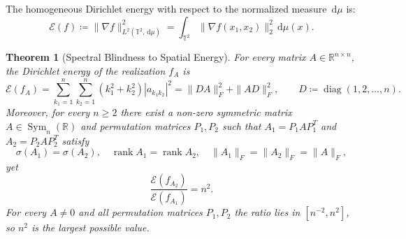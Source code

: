 \documentclass[11pt,a4paper,reqno]{amsart}
\newtheorem{theorem}{Theorem}[section]
\theoremstyle{definition}
\numberwithin{equation}{section}
\newcommand{\R}{\mathbb{R}}
\newcommand{\Tor}{\mathbb{T}}
\newcommand{\rank}{\operatorname{rank}}
\newcommand{\dif}{\,\mathrm{d}}
\begin{document}
The homogeneous Dirichlet energy with respect to the normalized measure $\dif\mu$ is:
\begin{equation}
    \mathcal{E}(f) \coloneqq \|\nabla f\|_{L^2(\Tor^2, \dif\mu)}^2 = \int_{\Tor^2} \|\nabla f(x_1, x_2)\|_2^2 \dif\mu(x).
\end{equation}

\begin{theorem}[Spectral Blindness to Spatial Energy]
\label{thm:dirichlet_blindness}
For every matrix $A \in \R^{n \times n}$, the Dirichlet energy of the realization $f_A$ is
\begin{equation}
    \label{eq:dirichlet_energy_formula}
    \mathcal{E}(f_A) = \sum_{k_1=1}^n \sum_{k_2=1}^n (k_1^2 + k_2^2) |a_{k_1 k_2}|^2 = \|DA\|_F^2 + \|AD\|_F^2, \qquad D \coloneqq \operatorname{diag}(1, 2, \dots, n).
\end{equation}
Moreover, for every $n \ge 2$ there exist a non-zero symmetric matrix $A \in \operatorname{Sym}_n(\R)$ and permutation matrices $P_1, P_2$ such that $A_1 = P_1 A P_1^T$ and $A_2 = P_2 A P_2^T$ satisfy
\begin{equation}
    \sigma(A_1) = \sigma(A_2), \quad \rank A_1 = \rank A_2, \quad \|A_1\|_F = \|A_2\|_F = \|A\|_F,
\end{equation}
yet
\begin{equation}
    \frac{\mathcal{E}(f_{A_2})}{\mathcal{E}(f_{A_1})} = n^2.
\end{equation}
For every $A \neq 0$ and all permutation matrices $P_1, P_2$ the ratio lies in $[n^{-2}, n^2]$, so $n^2$ is the largest possible value.
\end{theorem}
\end{document}
